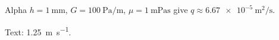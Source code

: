 \documentclass[11pt,aspectratio=169]{beamer}
\begin{document}
\begin{frame}{Alpha}
$h=\SI{1}{\milli\metre}$, $G=\SI{100}{\pascal\per\metre}$,
$\mu=\SI{1}{\milli\pascal\second}$ give
$q\approx\SI{6.67e-5}{\metre\squared\per\second}$.
\par Text: \SI{1.25}{\metre\per\second}.
\end{frame}
\end{document}
